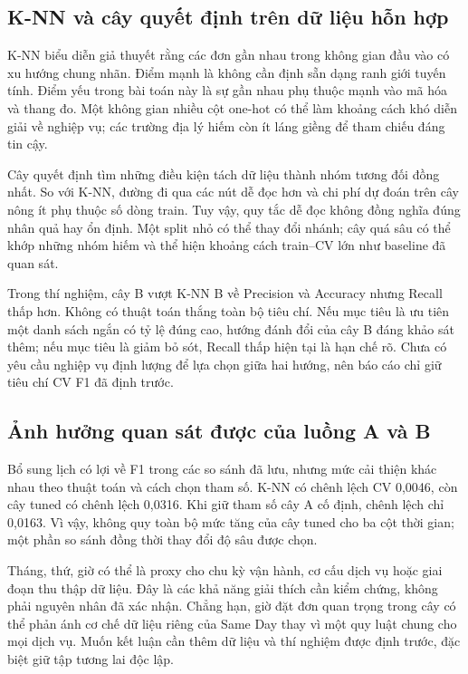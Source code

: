 \subsection{K-NN và cây quyết định trên dữ liệu hỗn hợp}
K-NN biểu diễn giả thuyết rằng các đơn gần nhau trong không gian đầu vào
có xu hướng chung nhãn. Điểm mạnh là không cần định sẵn dạng ranh giới
tuyến tính. Điểm yếu trong bài toán này là sự gần nhau phụ thuộc mạnh vào
mã hóa và thang đo. Một không gian nhiều cột one-hot có thể làm khoảng
cách khó diễn giải về nghiệp vụ; các trường địa lý hiếm còn ít láng giềng
để tham chiếu đáng tin cậy.

Cây quyết định tìm những điều kiện tách dữ liệu thành nhóm tương đối đồng
nhất. So với K-NN, đường đi qua các nút dễ đọc hơn và chi phí dự đoán trên
cây nông ít phụ thuộc số dòng train. Tuy vậy, quy tắc dễ đọc không đồng
nghĩa đúng nhân quả hay ổn định. Một split nhỏ có thể thay đổi nhánh; cây
quá sâu có thể khớp những nhóm hiếm và thể hiện khoảng cách train--CV lớn
như baseline đã quan sát.

Trong thí nghiệm, cây B vượt K-NN B về Precision và Accuracy nhưng Recall
thấp hơn. Không có thuật toán thắng toàn bộ tiêu chí. Nếu mục tiêu là
ưu tiên một danh sách ngắn có tỷ lệ đúng cao, hướng đánh đổi của cây B
đáng khảo sát thêm; nếu mục tiêu là giảm bỏ sót, Recall thấp hiện tại là
hạn chế rõ. Chưa có yêu cầu nghiệp vụ định lượng để lựa chọn giữa hai
hướng, nên báo cáo chỉ giữ tiêu chí CV F1 đã định trước.

\subsection{Ảnh hưởng quan sát được của luồng A và B}
Bổ sung lịch có lợi về F1 trong các so sánh đã lưu, nhưng mức cải thiện
khác nhau theo thuật toán và cách chọn tham số. K-NN có chênh lệch CV
0,0046, còn cây tuned có chênh lệch 0,0316. Khi giữ tham số cây A cố định,
chênh lệch chỉ 0,0163. Vì vậy, không quy toàn bộ mức tăng của cây tuned
cho ba cột thời gian; một phần so sánh đồng thời thay đổi độ sâu được chọn.

Tháng, thứ, giờ có thể là proxy cho chu kỳ vận hành, cơ cấu dịch vụ hoặc
giai đoạn thu thập dữ liệu. Đây là các khả năng giải thích cần kiểm chứng,
không phải nguyên nhân đã xác nhận. Chẳng hạn, giờ đặt đơn quan trọng trong
cây có thể phản ánh cơ chế dữ liệu riêng của Same Day thay vì một quy luật
chung cho mọi dịch vụ. Muốn kết luận cần thêm dữ liệu và thí nghiệm được
định trước, đặc biệt giữ tập tương lai độc lập.

